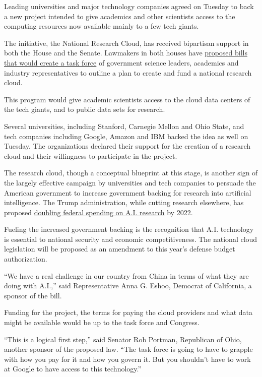 Leading universities and major technology companies agreed on Tuesday to
back a new project intended to give academics and other scientists
access to the computing resources now available mainly to a few tech
giants.

The initiative, the National Research Cloud, has received bipartisan
support in both the House and the Senate. Lawmakers in both houses have
\href{https://eshoo.house.gov/media/press-releases/reps-eshoo-gonzalez-sherrill-introduce-bipartisan-bicameral-legislation-develop}{proposed
bills that would create a task force} of government science leaders,
academics and industry representatives to outline a plan to create and
fund a national research cloud.

This program would give academic scientists access to the cloud data
centers of the tech giants, and to public data sets for research.

Several universities, including Stanford, Carnegie Mellon and Ohio
State, and tech companies including Google, Amazon and IBM backed the
idea as well on Tuesday. The organizations declared their support for
the creation of a research cloud and their willingness to participate in
the project.

The research cloud, though a conceptual blueprint at this stage, is
another sign of the largely effective campaign by universities and tech
companies to persuade the American government to increase government
backing for research into artificial intelligence. The Trump
administration, while cutting research elsewhere, has proposed
\href{https://insight.ieeeusa.org/articles/fy-2021-rd-budget-proposal/}{doubling
federal spending on A.I. research} by 2022.

Fueling the increased government backing is the recognition that A.I.
technology is essential to national security and economic
competitiveness. The national cloud legislation will be proposed as an
amendment to this year's defense budget authorization.

``We have a real challenge in our country from China in terms of what
they are doing with A.I.,'' said Representative Anna G. Eshoo, Democrat
of California, a sponsor of the bill.

Funding for the project, the terms for paying the cloud providers and
what data might be available would be up to the task force and Congress.

``This is a logical first step,'' said Senator Rob Portman, Republican
of Ohio, another sponsor of the proposed law. ``The task force is going
to have to grapple with how you pay for it and how you govern it. But
you shouldn't have to work at Google to have access to this
technology.''

